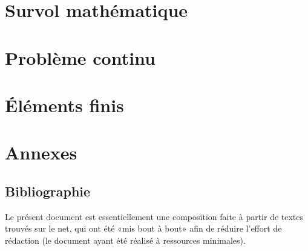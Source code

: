 \documentclass[11pt,pdflatex]{book}
\begin{document}
\cleardoublepage
\tableofcontents


 \part{Survol mathématique}
 
 
 
 
 
 

 \part{Problème continu}
 
 

 \part{Éléments finis}
 
 
 
 
 
 
 
 
 
 
 

 \appendix
 \part{Annexes}
 
 
 
 
 


\ifVersionDuDocEstVincent
   \chapter*{Bibliographie}

 Le présent document est essentiellement une composition faite à partir de textes trouvés sur le net, qui ont été «mis bout à bout» afin de réduire l'effort  de rédaction (le document ayant été réalisé à ressources minimales).
\end{document}
